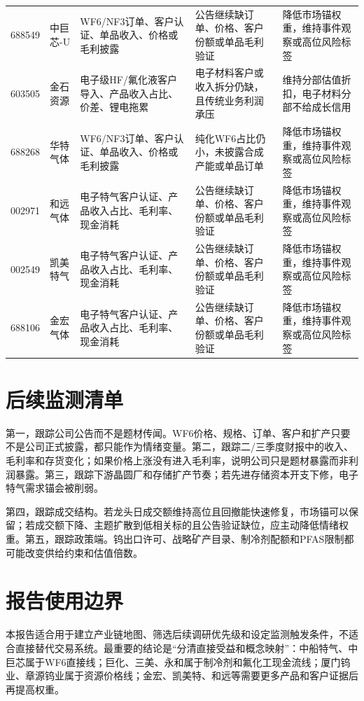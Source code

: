 \begin{exhibitbox}[逐标的风险监测触发器]
\begin{tabularx}{\exhibitboxwidth}{L{0.9cm} L{1.25cm} X X X}
688549 & 中巨芯-U & WF6/NF3订单、客户认证、单品收入、价格或毛利披露 & 公告继续缺订单、价格、客户份额或单品毛利验证 & 降低市场锚权重，维持事件观察或高位风险标签 \\
603505 & 金石资源 & 电子级HF/氟化液客户导入、产品收入占比、价差、锂电拖累 & 电子材料客户或收入拆分仍缺，且传统业务利润承压 & 维持分部估值折扣，电子材料分部不给成长信用 \\
688268 & 华特气体 & WF6/NF3订单、客户认证、单品收入、价格或毛利披露 & 纯化WF6占比仍小，未披露合成产能或单品订单 & 降低市场锚权重，维持事件观察或高位风险标签 \\
002971 & 和远气体 & 电子特气客户认证、产品收入占比、毛利率、现金消耗 & 公告继续缺订单、价格、客户份额或单品毛利验证 & 降低市场锚权重，维持事件观察或高位风险标签 \\
002549 & 凯美特气 & 电子特气客户认证、产品收入占比、毛利率、现金消耗 & 公告继续缺订单、价格、客户份额或单品毛利验证 & 降低市场锚权重，维持事件观察或高位风险标签 \\
688106 & 金宏气体 & 电子特气客户认证、产品收入占比、毛利率、现金消耗 & 公告继续缺订单、价格、客户份额或单品毛利验证 & 降低市场锚权重，维持事件观察或高位风险标签 \\
\bottomrule
\end{tabularx}
\end{exhibitbox}

\section{后续监测清单}
第一，跟踪公司公告而不是题材传闻。WF6价格、规格、订单、客户和扩产只要不是公司正式披露，都只能作为情绪变量。第二，跟踪二/三季度财报中的收入、毛利率和存货变化；如果价格上涨没有进入毛利率，说明公司只是题材暴露而非利润暴露。第三，跟踪下游晶圆厂和存储扩产节奏；若先进存储资本开支下修，电子特气需求锚会被削弱。

第四，跟踪成交结构。若龙头日成交额维持高位且回撤能快速修复，市场锚可以保留；若成交额下降、主题扩散到低相关标的且公告验证缺位，应主动降低情绪权重。第五，跟踪政策端。钨出口许可、战略矿产目录、制冷剂配额和PFAS限制都可能改变供给约束和估值倍数。

\section{报告使用边界}
本报告适合用于建立产业链地图、筛选后续调研优先级和设定监测触发条件，不适合直接替代交易系统。最重要的结论是“分清直接受益和概念映射”：中船特气、中巨芯属于WF6直接线；巨化、三美、永和属于制冷剂和氟化工现金流线；厦门钨业、章源钨业属于资源价格线；金宏、凯美特、和远等需要更多产品和客户证据后再提高权重。

